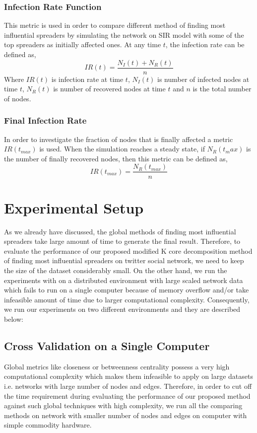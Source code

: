 \documentclass[sigconf]{acmart}
\begin{document}
\subsubsection{Infection Rate Function}
This metric is used in order to compare different method of finding most influential spreaders by simulating the network on SIR model with some of the top spreaders as initially affected ones. At any time $t$, the infection rate can be defined as,
\begin{equation}
IR(t) = \dfrac{N_I(t)+N_R(t)}{n}
\label{infection rate eq}
\end{equation}
Where $IR(t)$ is infection rate at time $t$, $N_I(t)$ is number of infected nodes at time $t$, $N_R(t)$ is number of recovered nodes at time $t$ and $n$ is the total number of nodes.
 
\subsubsection{Final Infection Rate}
In order to investigate the fraction of nodes that is finally affected a metric $IR(t_{max})$ is used. When the simulation reaches a steady state, if $N_R(t_max)$ is the number of finally recovered nodes, then this metric can be defined as,
\begin{equation}
IR(t_{max}) = \dfrac{N_R(t_{max})}{n}
\label{infection rate eq}
\end{equation}





\section{Experimental Setup}
As we already have discussed, the global methods of finding most influential spreaders take large amount of time to generate the final result. Therefore, to evaluate the performance of our proposed modified K core decomposition method of finding most influential spreaders on twitter social network, we need to keep the size of the dataset considerably small. On the other hand, we run the experiments with on a distributed environment with large scaled network data which fails to run on a single computer because of memory overflow and/or take infeasible amount of time due to larger computational complexity. Consequently, we run our experiments on two different environments and they are described below:

\subsection{Cross Validation on a Single Computer}
Global metrics like closeness or betweenness centrality possess a very high computational complexity which makes them infeasible to apply on large datasets i.e. networks with large number of nodes and edges. Therefore, in order to cut off the time requirement during evaluating the performance of our proposed method against such global techniques with high complexity, we run all the comparing methods on network with smaller number of nodes and edges  
on computer with simple commodity hardware. 
\end{document}
